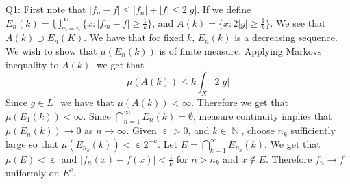 \documentclass[letterpaper]{article}
\DeclareMathOperator{\N}{\mathbb{N}}
\DeclareMathOperator{\ep}{\varepsilon}
\begin{document}
\noindent
Q1: First note that $|f_n-f|\leq |f_n| + |f| \leq 2|g|$. If we define $E_n(k) = \bigcup_{m=n}^\infty \{x: |f_m-f|\geq \frac{1}{k}\}$, and \newline $A(k) = \{x: 2|g| \geq \frac{1}{k}\}$. We see that $A(k)\supset E_n(K)$. We have that for fixed $k$, $E_n(k)$ is a decreasing sequence. We wish to show that $\mu(E_n(k))$ is of finite measure. Applying Markovs inequality to $A(k)$, we get that $$\mu(A(k)) \leq k \int_X 2|g|$$
Since $g\in L^1$ we have that $\mu(A(k)) <\infty$. Therefore we get that $\mu(E_1(k)) < \infty$. Since $\bigcap_{n=1}^\infty E_{n}(k) = \emptyset$, measure continuity implies that $\mu(E_n(k)) \to 0$ as $n\to \infty$. Given $\ep >0$, and $k\in \N$, choose $n_k$ sufficiently large so that $\mu(E_{n_k}(k))< \ep 2^{-k}$. Let $E = \bigcap_{k=1}^\infty E_{n_k}(k)$. We get that $\mu(E) < \ep$ and $|f_n(x)-f(x)|<\frac{1}{k}$ for $n>n_k$ and $x \notin E$. Therefore $f_n \to f$ uniformly on $E^c$.  
\end{document}
